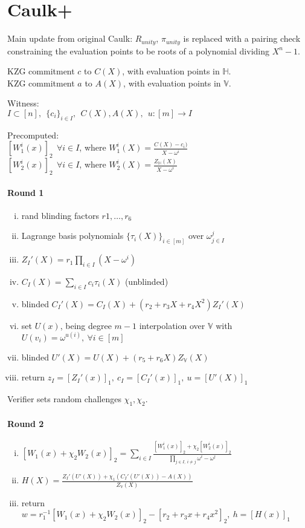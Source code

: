 \documentclass{article}
\theoremstyle{definition}
\begin{document}
\section{Caulk+}
Main update from original Caulk: $R_{unity}$, $\pi_{unity}$ is replaced with a pairing check constraining the evaluation points to be roots of a polynomial dividing $X^n-1$.

KZG commitment $c$ to $C(X)$, with evaluation points in $\mathbb{H}$.\\
KZG commitment $a$ to $A(X)$, with evaluation points in $\mathbb{V}$.

Witness:\\
$I \subset [n], ~~ \{ c_i \}_{i \in I} ,~~ C(X), A(X) ,~~ u: [m] \rightarrow I$

Precomputed:\\
$[W_1^i(x)]_2 ~~\forall i \in I$, where $W_1^i(X) = \frac{C(X) - c_i)}{X-\omega^i}$\\
$[W_2^i(x)]_2 ~~\forall i \in I$, where $W_2^i(X) = \frac{Z_{\mathbb{H}}(X)}{X-\omega^i}$

\paragraph{Round 1}
\begin{enumerate}[i.]
	\item rand blinding factors $r1, \ldots, r_6$
	\item Lagrange basis polynomials $\{ \tau_i(X) \}_{i \in [m]}$ over $\omega^j_{j \in I}$
	\item $Z_I'(X)= r_1 \prod_{i \in I} (X - \omega^i)$
	\item $C_I(X)=\sum_{i \in I} c_i \tau_i(X)$ (unblinded)
	\item blinded $C_I'(X)=C_I(X) + (r_2 + r_3 X + r_4 X^2) Z_I'(X)$
	\item set $U(x)$, being degree $m-1$ interpolation over $\mathbb{V}$ with $U(v_i)=\omega^{u(i)},~ \forall i\in [m]$
	\item blinded $U'(X)= U(X) + (r_5 + r_6 X) Z_{\mathbb{V}}(X)$
	\item return $z_I=[Z_I'(x)]_1,~ c_I=[C_I'(x)]_1,~ u=[U'(X)]_1$
\end{enumerate}

Verifier sets random challenges $\chi_1, \chi_2$.

\paragraph{Round 2}
\begin{enumerate}[i.]
	\item $[W_1(x)+ \chi_2 W_2(x)]_2 = \sum_{i \in I} \frac{[W_1^i(x)]_2 + \chi_2 [W_2^i(x)]_2}{\prod_{j \in I,~i \neq j} \omega^i - \omega^j}$
	\item $H(X) = \frac{Z_I'(U'(X)) + \chi_1 (C_I'(U'(X)) - A(X))}{Z_{\mathbb{V}}(X)}$
	\item return $w=r_1^{-1} [W_1(x) + \chi_2 W_2(x)]_2 - [r_2 + r_3 x + r_4 x^2]_2,~ h=[H(x)]_1$
\end{enumerate}
\end{document}

